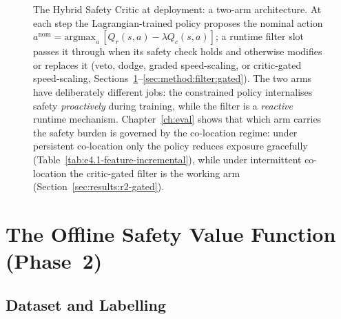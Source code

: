 \documentclass[11pt,a4paper]{report}
\begin{document}
\begin{figure}[htbp]
{%
}
\caption{The Hybrid Safety Critic at deployment: a two-arm
architecture. At each step the Lagrangian-trained policy proposes the
nominal action
$a^{\mathrm{nom}} = \mathrm{argmax}_a\,[Q_r(s,a) - \lambda Q_c(s,a)]$;
a runtime filter slot passes it through when its safety check holds
and otherwise modifies or replaces it (veto, dodge, graded
speed-scaling, or critic-gated speed-scaling,
Sections~\ref{sec:method:filter}--\ref{sec:method:filter:gated}). The
two arms have deliberately different jobs: the constrained policy
internalises safety \emph{proactively} during training, while the
filter is a \emph{reactive} runtime mechanism. Chapter~\ref{ch:eval}
shows that which arm carries the safety burden is governed by the
co-location regime: under persistent co-location only the policy
reduces exposure gracefully
(Table~\ref{tab:e4.1-feature-incremental}), while under intermittent
co-location the critic-gated filter is the working arm
(Section~\ref{sec:results:r2-gated}).}
\label{fig:hybrid-overview}
\end{figure}

\section{The Offline Safety Value Function (Phase~2)}
\label{sec:method:filter}

\subsection{Dataset and Labelling}
\label{sec:method:filter:data}
\end{document}
